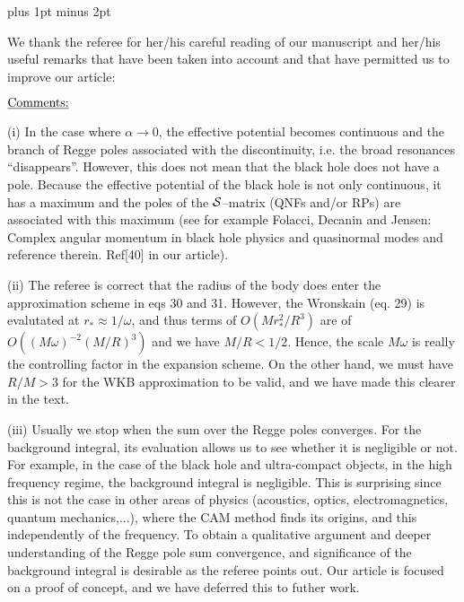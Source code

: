  \baselineskip=12pt plus 1pt minus 2pt
\nopagenumbers



\smallskip
{}

\smallskip
{}




\bigskip
\bigskip

We thank the referee for her/his careful reading of our manuscript and her/his useful remarks that have been taken into account and that have permitted us to improve our article:


\bigskip

\noindent $\underline{\hbox{Comments:}} $
\medskip


\bigskip
(i) In the case where $\alpha \rightarrow0$, the effective potential becomes continuous and the branch of Regge poles associated with the discontinuity, i.e. the broad resonances ``disappears''. However, this does not mean that the black hole does not have a pole. Because the effective potential of the black hole is not only continuous, it has a maximum and the poles of the $\cal{S}$--matrix (QNFs and/or RPs) are associated with this maximum (see for example Folacci, Decanin and Jensen: Complex angular momentum in black hole physics and quasinormal modes and reference therein. Ref[40] in our article). 


\bigskip
(ii) The referee is correct that the radius of the body does enter the approximation scheme in eqs 30 and 31. However, the Wronskain (eq. 29) is evalutated at  $r_{*} \approx 1/\omega$, and thus terms of  $O(M r_{*}^2 / R^3  )$ are of  $ O \left(  (M \omega)^{-2} (M/R)^3 \right) $ and we have $M/R< 1/2$. Hence, the  scale $M \omega$ is really the controlling factor in the expansion scheme. On the other hand, we must have $R/M>3$ for the WKB approximation to be valid, and we have made this clearer in the text. 




\bigskip
(iii)  Usually we stop when the sum over the Regge poles converges. For the background integral, its evaluation allows us to see whether it is negligible or not. For example, in the case of the black hole and ultra-compact objects, in the high frequency regime, the background integral is negligible. This is surprising since this is not the case in other areas of physics (acoustics, optics, electromagnetics, quantum mechanics,...), where the CAM method finds its origins, and this independently of the frequency. To obtain a qualitative argument and deeper understanding of the Regge pole sum convergence, and significance of the background integral is desirable as the referee points out. Our article is focused on a proof of concept, and we have deferred this to futher work.  


